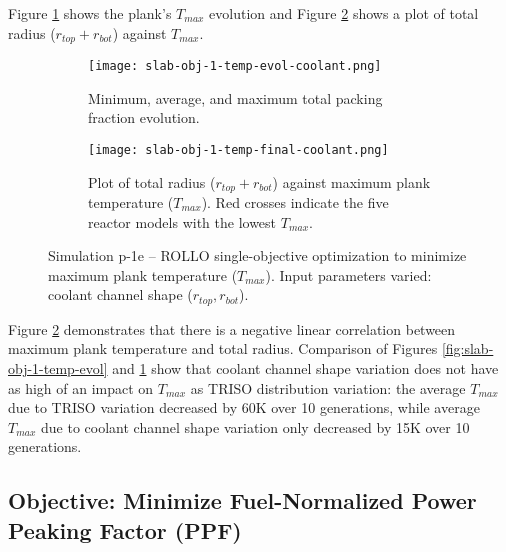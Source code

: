 Figure \ref{fig:slab-obj-1-temp-evol-coolant} shows the plank's $T_{max}$ evolution 
and Figure \ref{fig:slab-obj-1-temp-final-coolant} shows a plot of total radius 
($r_{top} + r_{bot}$) against $T_{max}$. 
\begin{figure}[htbp!]
    \centering
    \begin{subfigure}{\textwidth}
        \texttt{[image: slab-obj-1-temp-evol-coolant.png]}
        \caption{Minimum, average, and maximum total packing fraction evolution.}
        \label{fig:slab-obj-1-temp-evol-coolant} 
    \end{subfigure}
    \begin{subfigure}{\textwidth}
        \texttt{[image: slab-obj-1-temp-final-coolant.png]}
        \caption{Plot of total radius ($r_{top} + r_{bot}$) against maximum plank 
        temperature ($T_{max}$). Red crosses indicate the five reactor models with the 
        lowest $T_{max}$.}
        \label{fig:slab-obj-1-temp-final-coolant} 
    \end{subfigure}
    \caption{Simulation p-1e -- ROLLO single-objective optimization to minimize 
    maximum plank temperature ($T_{max}$). Input parameters varied: coolant channel shape 
    ($r_{top}, r_{bot}$).}
    \label{fig:slab-obj-1-temp-coolant}
\end{figure}
Figure \ref{fig:slab-obj-1-temp-final-coolant} demonstrates that there is a negative 
linear correlation between maximum plank temperature and total radius. 
Comparison of Figures \ref{fig:slab-obj-1-temp-evol} and 
\ref{fig:slab-obj-1-temp-evol-coolant} show that coolant channel shape variation 
does not have as high of an impact on $T_{max}$ as \gls{TRISO} distribution variation:  
the average $T_{max}$ due to \gls{TRISO} variation decreased by 60K over 10 generations, 
while average $T_{max}$ due to coolant channel shape variation only decreased by 15K
over 10 generations. 

\subsection{Objective: Minimize Fuel-Normalized Power Peaking Factor (PPF)}

